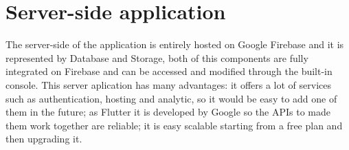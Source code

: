 \section{Server-side application}
The server-side of the application is entirely hosted on Google Firebase and it is represented by Database and Storage, both of this components are fully integrated on Firebase and can be accessed and modified through the built-in console. 
This server aplication has many advantages: it offers a lot of services such as authentication, hosting and analytic, so it would be easy to add one of them in the future; as Flutter it is developed by Google so the APIs to made them work together are reliable; it is easy scalable starting from a free plan and then upgrading it. 